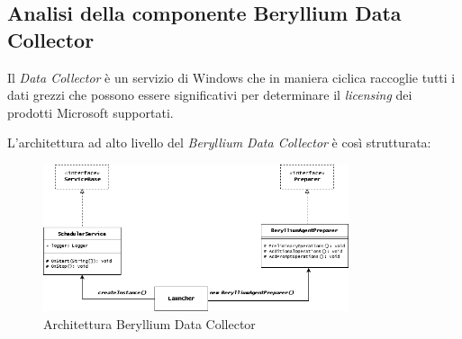 \subsection{Analisi della componente Beryllium Data Collector}

Il \emph{Data Collector} è un servizio di Windows che in maniera ciclica raccoglie tutti i dati grezzi che possono essere significativi per determinare il \emph{licensing} dei prodotti Microsoft supportati.

L’architettura ad alto livello del \emph{Beryllium Data Collector} è così strutturata: 
\begin{figure}[H]
    \centering
    \captionsetup{justification=centering,margin=2cm}
        \includegraphics[width=0.8\textwidth ]{figures/analisi2.png}
        \caption [Architettura Beryllium Data Collector]{Architettura Beryllium Data Collector \label{fig:architetturadatacollector}}
\end{figure}

